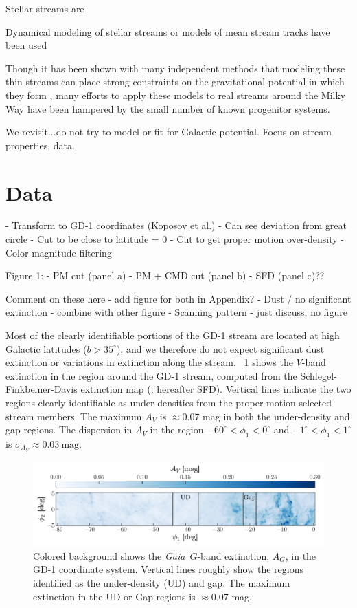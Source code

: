\documentclass[modern]{aastex62}
\newcommand{\gaia}{\textsl{Gaia}}
\begin{document}
Stellar streams are

\citealt{Bonaca:2018}

Dynamical modeling of stellar streams or models of mean stream tracks have been used


Though it has been shown with many independent methods that modeling these thin streams can place strong constraints on the gravitational potential in which they form \citep{apw14,TODO}, many efforts to apply these models to real streams around the Milky Way have been hampered by the small number of known progenitor systems.


We revisit...do not try to model or fit for Galactic potential. Focus on stream properties, data.

\section{Data}
\label{sec:data}

- Transform to GD-1 coordinates (Koposov et al.)
    - Can see deviation from great circle
- Cut to be close to latitude = 0
- Cut to get proper motion over-density
- Color-magnitude filtering

Figure 1:
- PM cut (panel a)
- PM + CMD cut (panel b)
- SFD (panel c)??

Comment on these here - add figure for both in Appendix?
- Dust / no significant extinction - combine with other figure
- Scanning pattern - just discuss, no figure

Most of the clearly identifiable portions of the GD-1 stream are located at high
Galactic latitudes ($b > 35^\circ$), and we therefore do not expect significant
dust extinction or variations in extinction along the stream.
\figurename~\ref{fig:sfd} shows the $V$-band extinction in the region around the
GD-1 stream, computed from the Schlegel-Finkbeiner-Davis extinction map
(\cite{Schlegel:1998}; hereafter SFD).
Vertical lines indicate the two regions clearly identifiable as under-densities
from the proper-motion-selected stream members.
The maximum $A_V$ is $\approx$0.07 mag in both the under-density and gap
regions.
The dispersion in $A_V$ in the region $-60^\circ < \phi_1 < 0^\circ$ and
$-1^\circ < \phi_1 < 1^\circ$ is $\sigma_{A_V} \approx 0.03~\textrm{mag}$.

\begin{figure}[h]
\begin{center}
\includegraphics[width=\textwidth]{sfd.pdf}
\end{center}
\caption{%
Colored background shows the \gaia\ $G$-band extinction, $A_G$, in the GD-1
coordinate system.
Vertical lines roughly show the regions identified as the under-density (UD) and
gap.
The maximum extinction in the UD or Gap regions is $\approx$0.07 mag.
\label{fig:sfd}
}
\end{figure}
\end{document}
